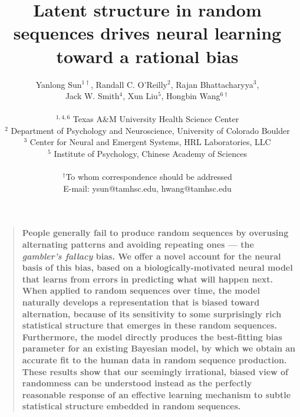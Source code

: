 \documentclass[11pt]{article}
\title{Latent structure in random sequences drives neural learning toward a rational bias}
\author
{Yanlong Sun$^{1\dagger}$, Randall C. O'Reilly$^{2}$, Rajan Bhattacharyya$^3$,\\
Jack W. Smith$^4$, Xun Liu$^5$, Hongbin Wang$^{6\dagger}$\\
\\
\normalsize{$^{1,4,6}$ Texas A\&M University Health Science Center}\\
\normalsize{$^{2}$ Department of Psychology and Neuroscience, University of Colorado Boulder} \\
\normalsize{$^{3}$ Center for Neural and Emergent Systems, HRL Laboratories, LLC} \\
\normalsize{$^{5}$ Institute of Psychology, Chinese Academy of Sciences} \\
\\
\normalsize{$^\dagger$To whom correspondence should be addressed}\\
\normalsize{E-mail:  ysun@tamhsc.edu, hwang@tamhsc.edu}
}
\date{}
\newenvironment{sciabstract}{%
\begin{quote} \bf}
{\end{quote}}
\begin{document}
\baselineskip18pt


\maketitle




\begin{sciabstract}
People generally fail to produce random sequences by overusing alternating patterns and avoiding repeating ones --- the {\em gambler's fallacy} bias.
We offer a novel account for the neural basis of this bias, based on a biologically-motivated neural model that learns from errors in predicting what will happen next.  When applied to random sequences over time, the model naturally develops a representation that is biased toward alternation, because of its sensitivity to some surprisingly rich statistical structure that emerges in these random sequences.
Furthermore, the model directly produces the best-fitting bias parameter for an existing Bayesian model, by which we obtain an accurate fit to the human data in random sequence production.  These results show that our seemingly irrational, biased view of randomness can be understood instead as the perfectly reasonable response of an effective learning mechanism to subtle statistical structure embedded in random sequences.
\end{sciabstract}
\end{document}
